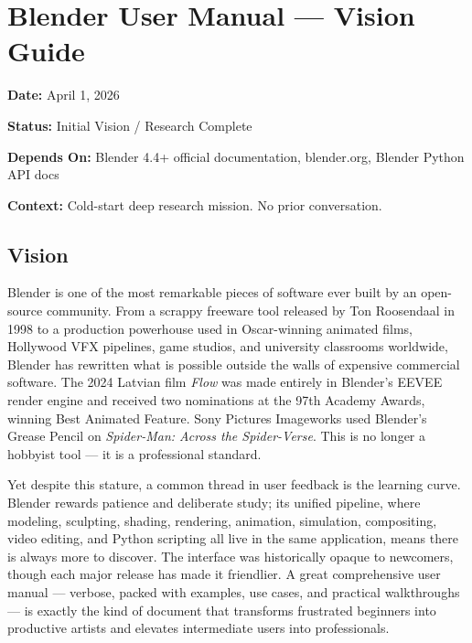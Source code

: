 \documentclass[11pt,letterpaper]{article}
\newcommand{\stageheader}[2]{%
  \noindent\colorbox{#2}{\makebox[\textwidth][l]{%
    \textcolor{white}{\bfseries\sffamily\hspace{6pt}#1\hspace{6pt}}}}%
  \vspace{0.5em}\par%
}
\newcommand{\metafield}[2]{\textbf{\sffamily #1} #2\par}
\begin{document}
\tableofcontents
\newpage

\stageheader{STAGE 1 --- VISION DOCUMENT}{primary}

\section{Blender User Manual --- Vision Guide}

\metafield{Date:}{April 1, 2026}
\metafield{Status:}{Initial Vision / Research Complete}
\metafield{Depends On:}{Blender 4.4+ official documentation, blender.org, Blender Python API docs}
\metafield{Context:}{Cold-start deep research mission. No prior conversation.}

\subsection{Vision}

Blender is one of the most remarkable pieces of software ever built by an open-source community. From a scrappy freeware tool released by Ton Roosendaal in 1998 to a production powerhouse used in Oscar-winning animated films, Hollywood VFX pipelines, game studios, and university classrooms worldwide, Blender has rewritten what is possible outside the walls of expensive commercial software. The 2024 Latvian film \textit{Flow} was made entirely in Blender's EEVEE render engine and received two nominations at the 97th Academy Awards, winning Best Animated Feature. Sony Pictures Imageworks used Blender's Grease Pencil on \textit{Spider-Man: Across the Spider-Verse}. This is no longer a hobbyist tool --- it is a professional standard.

Yet despite this stature, a common thread in user feedback is the learning curve. Blender rewards patience and deliberate study; its unified pipeline, where modeling, sculpting, shading, rendering, animation, simulation, compositing, video editing, and Python scripting all live in the same application, means there is always more to discover. The interface was historically opaque to newcomers, though each major release has made it friendlier. A great comprehensive user manual --- verbose, packed with examples, use cases, and practical walkthroughs --- is exactly the kind of document that transforms frustrated beginners into productive artists and elevates intermediate users into professionals.
\end{document}
